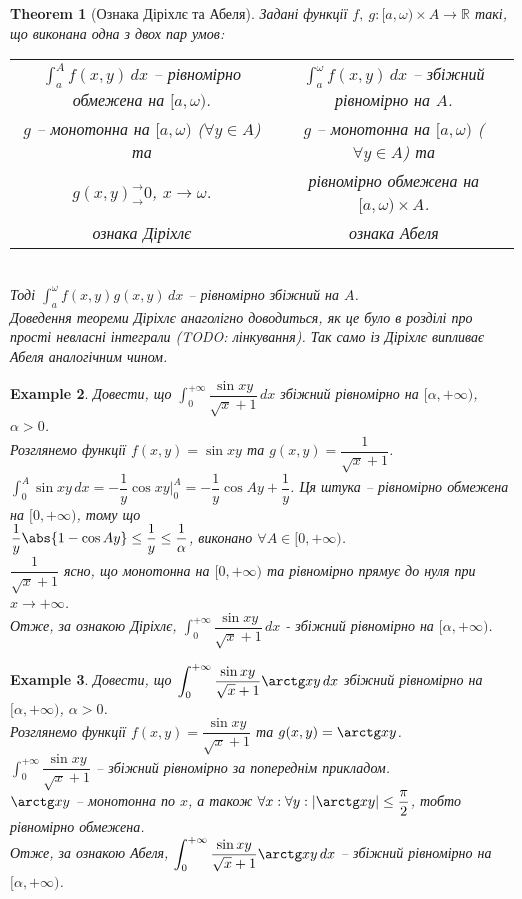 \documentclass[a4paper, 10pt]{article}
\def\huge{\displaystyle}
\theoremstyle{theoremdd}
\newtheorem{theorem}{Theorem}[subsection]
\theoremstyle{theoremdd}
\theoremstyle{theoremdd}
\theoremstyle{theoremdd}
\theoremstyle{theoremdd}
\newtheorem{example}[theorem]{Example}
\theoremstyle{theoremdd}
\theoremstyle{theoremdd}
\theoremstyle{theoremdd}
\theoremstyle{theoremdd}
\begin{document}
\begin{theorem}[Ознака Діріхлє та Абеля]
Задані функції $f,\ g \colon [a,\omega) \times A \to \mathbb{R}$ такі, що виконана одна з двох пар умов:\\
 \begin{tabular}{c|c}
$\huge\int_a^A f(x,y)\,dx$ -- рівномірно обмежена на $[a,\omega)$. & $\huge\int_a^\omega f(x,y)\,dx$ -- збіжний рівномірно на $A$. \\
$g$ -- монотонна на $[a,\omega)$ ($\forall y \in A$) та  & $g$ -- монотонна на $[a,\omega)$ ($\forall y \in A$) та \\
 $g(x,y)^\rightarrow_\rightarrow 0$, $x \to \omega$. & рівномірно обмежена на $[a,\omega) \times A$. \\
\textit{ознака Діріхлє} & \textit{ознака Абеля}
\end{tabular}\\
Тоді $\huge \int_a^\omega f(x,y) g(x,y)\,dx$ -- рівномірно збіжний на $A$.\\
\textit{Доведення теореми Діріхлє анаголігно доводиться, як це було в розділі про прості невласні інтеграли (TODO: лінкування). Так само із Діріхлє випливає Абеля аналогічним чином.}
\end{theorem}

\begin{example}
Довести, що $\huge\int_0^{+\infty} \dfrac{\sin xy}{\sqrt{x}+1}\,dx$ збіжний рівномірно на $[\alpha,+\infty)$, $\alpha>0$.\\
Розглянемо функції $f(x,y) = \sin xy$ та $g(x,y) = \dfrac{1}{\sqrt{x}+1}$.\\
$\huge\int_0^A \sin xy\,dx = -\dfrac{1}{y} \cos xy \Big|_{0}^A = -\dfrac{1}{y} \cos Ay + \dfrac{1}{y}$. Ця штука -- рівномірно обмежена на $[0,+\infty)$, тому що\\
$\dfrac{1}{y} \abs{1 - \cos Ay} \leq \dfrac{1}{y} \leq \dfrac{1}{\alpha}$, виконано $\forall A \in [0,+\infty)$.\\
$\dfrac{1}{\sqrt{x}+1}$ ясно, що монотонна на $[0,+\infty)$ та рівномірно прямує до нуля при $x \to +\infty$.\\
Отже, за ознакою Діріхлє, $\huge\int_0^{+\infty} \dfrac{\sin xy}{\sqrt{x}+1}\,dx$ - збіжний рівномірно на $[\alpha,+\infty)$.
\end{example}

\begin{example}
Довести, що $\huge\int_0^{+\infty} \dfrac{\sin xy}{\sqrt{x}+1} \arctg xy\,dx$ збіжний рівномірно на $[\alpha,+\infty)$, $\alpha>0$.\\
Розглянемо функції $f(x,y) = \dfrac{\sin xy}{\sqrt{x}+1}$ та $g(x,y) = \arctg xy$.\\
$\huge\int_0^{+\infty} \dfrac{\sin xy}{\sqrt{x}+1}$ -- збіжний рівномірно за попереднім прикладом.\\
$\arctg xy$ -- монотонна по $x$, а також $\forall x: \forall y: |\arctg xy| \leq \dfrac{\pi}{2}$, тобто рівномірно обмежена.\\
Отже, за ознакою Абеля, $\huge\int_0^{+\infty} \dfrac{\sin xy}{\sqrt{x}+1} \arctg xy\,dx$ -- збіжний рівномірно на $[\alpha,+\infty)$.
\end{example}
\end{document}
